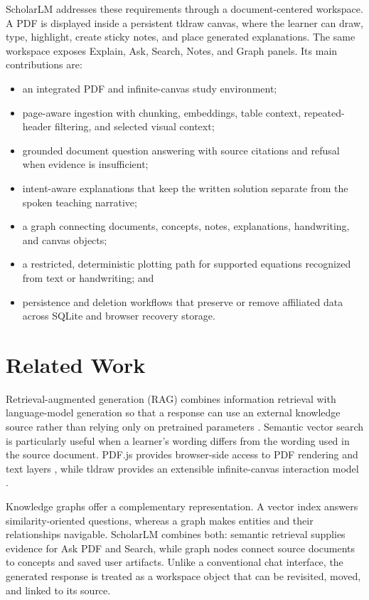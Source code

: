\documentclass[conference]{IEEEtran}
\begin{document}
ScholarLM addresses these requirements through a document-centered workspace. A PDF is displayed inside a persistent tldraw canvas, where the learner can draw, type, highlight, create sticky notes, and place generated explanations. The same workspace exposes Explain, Ask, Search, Notes, and Graph panels. Its main contributions are:

\begin{itemize}
\item an integrated PDF and infinite-canvas study environment;
\item page-aware ingestion with chunking, embeddings, table context, repeated-header filtering, and selected visual context;
\item grounded document question answering with source citations and refusal when evidence is insufficient;
\item intent-aware explanations that keep the written solution separate from the spoken teaching narrative;
\item a graph connecting documents, concepts, notes, explanations, handwriting, and canvas objects;
\item a restricted, deterministic plotting path for supported equations recognized from text or handwriting; and
\item persistence and deletion workflows that preserve or remove affiliated data across SQLite and browser recovery storage.
\end{itemize}

\section{Related Work}
Retrieval-augmented generation (RAG) combines information retrieval with language-model generation so that a response can use an external knowledge source rather than relying only on pretrained parameters \cite{rag}. Semantic vector search is particularly useful when a learner's wording differs from the wording used in the source document. PDF.js provides browser-side access to PDF rendering and text layers \cite{pdfjs}, while tldraw provides an extensible infinite-canvas interaction model \cite{tldraw}.

Knowledge graphs offer a complementary representation. A vector index answers similarity-oriented questions, whereas a graph makes entities and their relationships navigable. ScholarLM combines both: semantic retrieval supplies evidence for Ask PDF and Search, while graph nodes connect source documents to concepts and saved user artifacts. Unlike a conventional chat interface, the generated response is treated as a workspace object that can be revisited, moved, and linked to its source.
\end{document}
